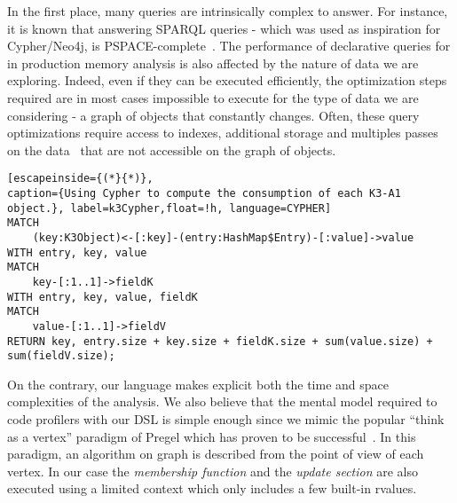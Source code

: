 In the first place, many queries are intrinsically complex to answer.
For instance, it is known that answering SPARQL queries - which was used as inspiration for Cypher/Neo4j, is PSPACE-complete~\cite{Schmidt:2010:FSQ:1804669.1804675, Perez:2009:SCS:1567274.1567278}.
The performance of declarative queries for in production memory analysis is also affected by the nature of data we are exploring. 
Indeed, even if they can be executed efficiently, the optimization steps required are in most cases impossible to execute for the type of data we are considering - a graph of objects that constantly changes.
Often, these query optimizations require access to indexes, additional storage and multiples passes on the data~\cite{Elhemali:2007:ESS:1247480.1247598, Dageville:2002:SMM:1287369.1287454} that are not accessible on the graph of objects.
\begin{lstlisting}[escapeinside={(*}{*)},
caption={Using Cypher to compute the consumption of each K3-A1 object.}, label=k3Cypher,float=!h, language=CYPHER]
MATCH 
	(key:K3Object)<-[:key]-(entry:HashMap$Entry)-[:value]->value
WITH entry, key, value
MATCH 
	key-[:1..1]->fieldK
WITH entry, key, value, fieldK
MATCH 
	value-[:1..1]->fieldV
RETURN key, entry.size + key.size + fieldK.size + sum(value.size) + sum(fieldV.size);
\end{lstlisting}

On the contrary, our language makes explicit both the time and space complexities of the analysis.
We also believe that the mental model required to code profilers with our DSL is simple enough since
we mimic the popular ``think as a vertex'' paradigm of Pregel which has proven to be successful~\cite{Malewicz:2010:PSL:1807167.1807184}.
In this paradigm, an algorithm on graph is described from the point of view of each vertex.
In our case the \textit{membership function} and the \textit{update section} are also executed using a limited context which only includes a few built-in rvalues.


